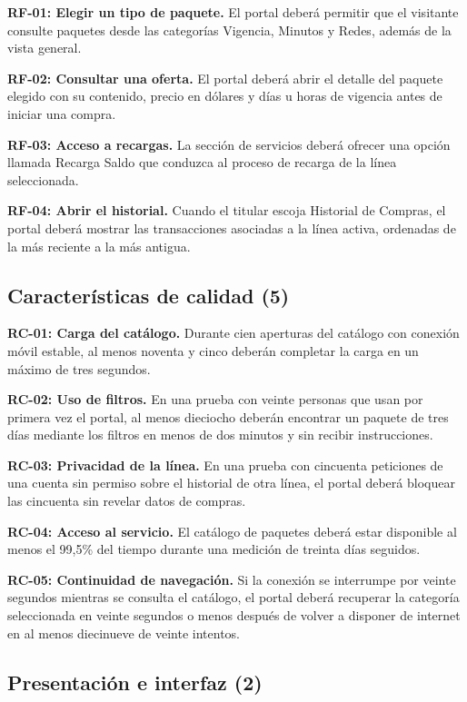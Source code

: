 \documentclass[12pt,a4paper]{article}
\begin{document}
\noindent\textbf{RF-01: Elegir un tipo de paquete.} El portal deberá permitir que el visitante consulte paquetes desde las categorías Vigencia, Minutos y Redes, además de la vista general.


\noindent\textbf{RF-02: Consultar una oferta.} El portal deberá abrir el detalle del paquete elegido con su contenido, precio en dólares y días u horas de vigencia antes de iniciar una compra.


\noindent\textbf{RF-03: Acceso a recargas.} La sección de servicios deberá ofrecer una opción llamada Recarga Saldo que conduzca al proceso de recarga de la línea seleccionada.


\noindent\textbf{RF-04: Abrir el historial.} Cuando el titular escoja Historial de Compras, el portal deberá mostrar las transacciones asociadas a la línea activa, ordenadas de la más reciente a la más antigua.


\subsection{Características de calidad (5)}

\noindent\textbf{RC-01: Carga del catálogo.} Durante cien aperturas del catálogo con conexión móvil estable, al menos noventa y cinco deberán completar la carga en un máximo de tres segundos.


\noindent\textbf{RC-02: Uso de filtros.} En una prueba con veinte personas que usan por primera vez el portal, al menos dieciocho deberán encontrar un paquete de tres días mediante los filtros en menos de dos minutos y sin recibir instrucciones.


\noindent\textbf{RC-03: Privacidad de la línea.} En una prueba con cincuenta peticiones de una cuenta sin permiso sobre el historial de otra línea, el portal deberá bloquear las cincuenta sin revelar datos de compras.


\noindent\textbf{RC-04: Acceso al servicio.} El catálogo de paquetes deberá estar disponible al menos el 99,5\% del tiempo durante una medición de treinta días seguidos.


\noindent\textbf{RC-05: Continuidad de navegación.} Si la conexión se interrumpe por veinte segundos mientras se consulta el catálogo, el portal deberá recuperar la categoría seleccionada en veinte segundos o menos después de volver a disponer de internet en al menos diecinueve de veinte intentos.


\subsection{Presentación e interfaz (2)}
\end{document}
